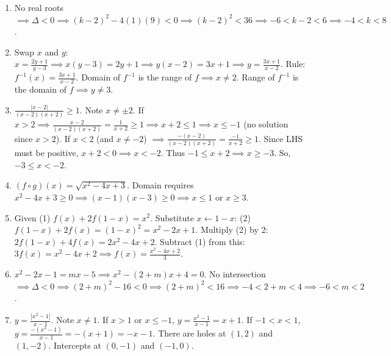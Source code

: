 \documentclass[11pt,a4paper]{article}
\begin{document}
\begin{enumerate}
    \item No real roots $\implies \Delta < 0 \implies (k-2)^2 - 4(1)(9) < 0 \implies (k-2)^2 < 36 \implies -6 < k-2 < 6 \implies -4 < k < 8$.
    \vspace{0.5cm}

    \item Swap $x$ and $y$: $x = \frac{2y+1}{y-3} \implies x(y-3) = 2y + 1 \implies y(x-2) = 3x+1 \implies y = \frac{3x+1}{x-2}$.
    Rule: $f^{-1}(x) = \frac{3x+1}{x-2}$.
    Domain of $f^{-1}$ is the range of $f \implies x \neq 2$.
    Range of $f^{-1}$ is the domain of $f \implies y \neq 3$.
    \vspace{0.5cm}

    \item $\frac{|x - 2|}{(x-2)(x+2)} \ge 1$. Note $x \neq \pm 2$.
    If $x > 2 \implies \frac{x-2}{(x-2)(x+2)} = \frac{1}{x+2} \ge 1 \implies x+2 \le 1 \implies x \le -1$ (no solution since $x > 2$).
    If $x < 2$ (and $x \neq -2$) $\implies \frac{-(x-2)}{(x-2)(x+2)} = \frac{-1}{x+2} \ge 1$. Since LHS must be positive, $x+2 < 0 \implies x < -2$. Thus $-1 \le x+2 \implies x \ge -3$.
    So, $-3 \le x < -2$.
    \vspace{0.5cm}

    \item $(f \circ g)(x) = \sqrt{x^2 - 4x + 3}$.
    Domain requires $x^2 - 4x + 3 \ge 0 \implies (x-1)(x-3) \ge 0 \implies x \le 1$ or $x \ge 3$.
    \vspace{0.5cm}

    \item Given (1) $f(x) + 2f(1-x) = x^2$.
    Substitute $x \leftarrow 1-x$: (2) $f(1-x) + 2f(x) = (1-x)^2 = x^2 - 2x + 1$.
    Multiply (2) by 2: $2f(1-x) + 4f(x) = 2x^2 - 4x + 2$.
    Subtract (1) from this: $3f(x) = x^2 - 4x + 2 \implies f(x) = \frac{x^2 - 4x + 2}{3}$.
    \vspace{0.5cm}

    \item $x^2 - 2x - 1 = mx - 5 \implies x^2 - (2+m)x + 4 = 0$.
    No intersection $\implies \Delta < 0 \implies (2+m)^2 - 16 < 0 \implies (2+m)^2 < 16 \implies -4 < 2+m < 4 \implies -6 < m < 2$.
    \vspace{0.5cm}

    \item $y = \frac{|x^2 - 1|}{x - 1}$. Note $x \neq 1$.
    If $x > 1$ or $x \le -1$, $y = \frac{x^2 - 1}{x - 1} = x + 1$.
    If $-1 < x < 1$, $y = \frac{-(x^2 - 1)}{x - 1} = -(x+1) = -x - 1$.
    There are holes at $(1, 2)$ and $(1, -2)$. Intercepts at $(0, -1)$ and $(-1, 0)$.
    \vspace{0.5cm}
\end{enumerate}
\end{document}

